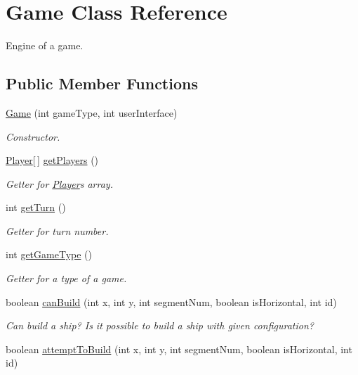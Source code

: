 \hypertarget{classGame}{}\section{Game Class Reference}
\label{classGame}


Engine of a game.  


\subsection*{Public Member Functions}
\begin{DoxyCompactItemize}
\item 
\hyperlink{classGame_ae0ca81a868814b02a8267768494527b2}{Game} (int game\+Type, int user\+Interface)
\begin{DoxyCompactList}\small\item\em Constructor. \end{DoxyCompactList}\item 
\hyperlink{classPlayer}{Player}\mbox{[}$\,$\mbox{]} \hyperlink{classGame_a506ae8e369b87240b4c93e6da86d5cee}{get\+Players} ()
\begin{DoxyCompactList}\small\item\em Getter for \hyperlink{classPlayer}{Player}\textquotesingle{}s array. \end{DoxyCompactList}\item 
int \hyperlink{classGame_ae518e278826e5feba6f9fc5f3818ad02}{get\+Turn} ()
\begin{DoxyCompactList}\small\item\em Getter for turn number. \end{DoxyCompactList}\item 
int \hyperlink{classGame_a21b344d249e50b6a12fbbb2ab15fd988}{get\+Game\+Type} ()
\begin{DoxyCompactList}\small\item\em Getter for a type of a game. \end{DoxyCompactList}\item 
boolean \hyperlink{classGame_af151f3c1db692f8dc482b5ad2351c723}{can\+Build} (int x, int y, int segment\+Num, boolean is\+Horizontal, int id)
\begin{DoxyCompactList}\small\item\em Can build a ship? Is it possible to build a ship with given configuration? \end{DoxyCompactList}\item 
boolean \hyperlink{classGame_af2b475289d83fd193e7e648e0f98a69d}{attempt\+To\+Build} (int x, int y, int segment\+Num, boolean is\+Horizontal, int id)

\end{DoxyCompactItemize}
